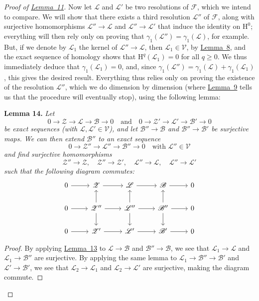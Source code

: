 \documentclass{article}
\newenvironment{itenv}[1]
  {\phantomsection\par\medskip\noindent\textbf{#1.}\itshape}
  {\medskip}
\newcommand{\scr}[1]{{\mathscr{#1}}}
\renewcommand{\cal}[1]{{\mathcal{#1}}}
\newcommand{\HH}{\mathrm{H}}
\renewcommand{\geq}{\geqslant}
\newcommand{\oldpage}[1]{\marginpar{\footnotesize$\Big\vert$ \textit{p.~#1}}}
\begin{document}
\begin{proof}[Proof of {\hyperref[lemma11]{Lemma~11}}]
  Now let $\scr{L}$ and $\scr{L}'$ be two resolutions of $\scr{F}$, which we intend to compare.
  We will show that there exists a third resolution $\scr{L}''$ of $\scr{F}$, along with surjective homomorphisms $\scr{L}''\to\scr{L}$ and $\scr{L}''\to\scr{L}'$ that induce the identity on $\HH^0$;
  everything will then rely only on proving that $\gamma_1(\scr{L}'')=\gamma_1(\scr{L})$, for example.
  But, if we denote by $\scr{L}_1$ the kernel of $\scr{L}''\to\scr{L}$, then $\scr{L}_1\in\cal{V}$, by \hyperref[lemma8]{Lemma~8}, and the exact sequence of homology shows that $\HH^q(\scr{L}_1)=0$ for all $q\geq0$.
  We thus immediately deduce that $\gamma_1(\scr{L}_1)=0$, and, since $\gamma_1(\scr{L}'')=\gamma_1(\scr{L})+\gamma_1(\scr{L}_1)$, this gives the desired result.
  Everything thus relies only on proving the existence of the resolution $\scr{L}''$, which we do dimension by dimension (where \hyperref[lemma9]{Lemma~9} tells us that the procedure will eventually stop), using the following lemma:
  \begin{itenv}{Lemma 14}
  \label{lemma14}
    Let
    \[
      0\to\scr{Z}\to\scr{L}\to\scr{B}\to0
      \quad\text{and}\quad
      0\to\scr{Z}'\to\scr{L}'\to\scr{B}'\to0
    \]
    be exact sequences (with $\scr{L},\scr{L}'\in\cal{V}$), and let $\scr{B}''\to\scr{B}$ and $\scr{B}''\to\scr{B}'$ be surjective maps.
    We can then extend $\scr{B}''$ to an exact sequence
    \[
      0\to\scr{Z}''\to\scr{L}''\to\scr{B}''\to0
      \quad
      \mbox{with $\scr{L}''\in\cal{V}$}
    \]
    and find surjective homomorphisms
    \[
      \scr{Z}''\to\scr{Z},
      \quad
      \scr{Z}''\to\scr{Z}',
      \quad
      \scr{L}''\to\scr{L},
      \quad
      \scr{L}''\to\scr{L}'
    \]
    such that the following diagram commutes:
    \[
      \begin{tikzcd}
        0 \rar
        & \scr{Z} \rar
        & \scr{L} \rar
        & \scr{B} \rar
        & 0
      \\0 \rar
        & \scr{Z}'' \rar \uar \dar
        & \scr{L}'' \rar \uar \dar
        & \scr{B}'' \rar \uar \dar
        & 0
      \\0 \rar
        & \scr{Z}' \rar
        & \scr{L}' \rar
        & \scr{B}' \rar
        & 0
      \end{tikzcd}
    \]
  \end{itenv}
  \begin{proof}
\oldpage{108}
    By applying \hyperref[lemma13]{Lemma~13} to $\scr{L}\to\scr{B}$ and $\scr{B}''\to\scr{B}$, we see that $\scr{L}_1\to\scr{L}$ and $\scr{L}_1\to\scr{B}''$ are surjective.
    By applying the same lemma to $\scr{L}_1\to\scr{B}''\to\scr{B}'$ and $\scr{L}'\to\scr{B}'$, we see that $\scr{L}_2\to\scr{L}_1$ and $\scr{L}_2\to\scr{L}'$ are surjective, making the diagram commute.


\end{proof}
\end{proof}
\end{document}

